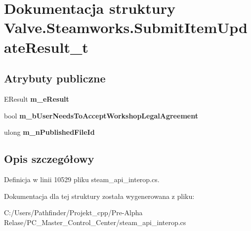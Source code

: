 \hypertarget{struct_valve_1_1_steamworks_1_1_submit_item_update_result__t}{}\section{Dokumentacja struktury Valve.\+Steamworks.\+Submit\+Item\+Update\+Result\+\_\+t}
\label{struct_valve_1_1_steamworks_1_1_submit_item_update_result__t}
\subsection*{Atrybuty publiczne}
\begin{DoxyCompactItemize}
\item 
\mbox{\label{struct_valve_1_1_steamworks_1_1_submit_item_update_result__t_ab577dbed62ff0acac6fccff9d90255ba}} 
E\+Result {\bfseries m\+\_\+e\+Result}
\item 
\mbox{\label{struct_valve_1_1_steamworks_1_1_submit_item_update_result__t_a0326b0636f48a3653025bc1537019bfe}} 
bool {\bfseries m\+\_\+b\+User\+Needs\+To\+Accept\+Workshop\+Legal\+Agreement}
\item 
\mbox{\label{struct_valve_1_1_steamworks_1_1_submit_item_update_result__t_aa5b299c51e74a14a77442bdaec1b9607}} 
ulong {\bfseries m\+\_\+n\+Published\+File\+Id}
\end{DoxyCompactItemize}


\subsection{Opis szczegółowy}


Definicja w linii 10529 pliku steam\+\_\+api\+\_\+interop.\+cs.



Dokumentacja dla tej struktury została wygenerowana z pliku\+:\begin{DoxyCompactItemize}
\item 
C\+:/\+Users/\+Pathfinder/\+Projekt\+\_\+cpp/\+Pre-\/\+Alpha Relase/\+P\+C\+\_\+\+Master\+\_\+\+Control\+\_\+\+Center/steam\+\_\+api\+\_\+interop.\+cs\end{DoxyCompactItemize}
